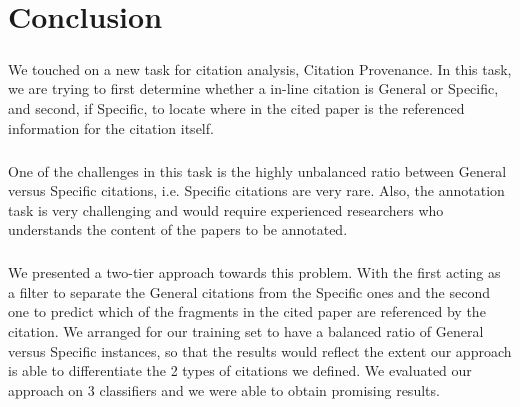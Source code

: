 \chapter{Conclusion}
\label{conclusion}
\paragraph{}
We touched on a new task for citation analysis, Citation Provenance. In this task, we are trying to first determine whether a in-line citation is General or Specific, and second, if Specific, to locate where in the cited paper is the referenced information for the citation itself.

\paragraph{}
One of the challenges in this task is the highly unbalanced ratio between General versus Specific citations, i.e. Specific citations are very rare. Also, the annotation task is very challenging and would require experienced researchers who understands the content of the papers to be annotated.

\paragraph{}
We presented a two-tier approach towards this problem. With the first acting as a filter to separate the General citations from the Specific ones and the second one to predict which of the fragments in the cited paper are referenced by the citation. We arranged for our training set to have a balanced ratio of General versus Specific instances, so that the results would reflect the extent our approach is able to differentiate the 2 types of citations we defined. We evaluated our approach on 3 classifiers and we were able to obtain promising results.